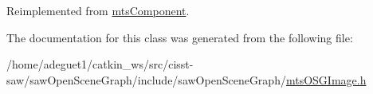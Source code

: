 Reimplemented from \hyperlink{classmts_component_aaf28f0262b44eb6866e10089a02fa6e4}{mts\-Component}.



The documentation for this class was generated from the following file\-:\begin{DoxyCompactItemize}
\item 
/home/adeguet1/catkin\-\_\-ws/src/cisst-\/saw/saw\-Open\-Scene\-Graph/include/saw\-Open\-Scene\-Graph/\hyperlink{mts_o_s_g_image_8h}{mts\-O\-S\-G\-Image.\-h}\end{DoxyCompactItemize}
